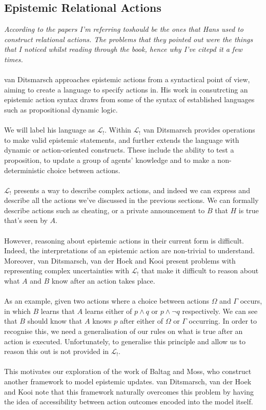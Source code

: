\documentclass[12pt, a4paper, twoside]{article}
\begin{document}
\subsection{Epistemic Relational Actions} \label{epi_acts}
{\em According to \citep{hoek2008dynamic} the papers I'm referring toshould be
	the ones that Hans used to construct relational actions.
The problems that they pointed out were the things that I noticed whilst reading
through the book, hence why I've citepd it a few times.}\\
\\
van Ditsmarsch approaches epistemic actions from a syntactical point of view,
aiming to create a language to specify actions in.
His work in consutrcting an epistemic action syntax draws from some of the
syntax of established languages such as propositional dynamic
logic.\citep{ditmarsch99knowledge,ditmarsch2002dga}\\
\\
We will label his language as $\mathcal{L}_{!}$.
Within $\mathcal{L}_{!}$ van Ditsmarsch provides operations to make valid
epistemic statements, and further extends the language with dynamic or
action-oriented constructs.
These include the ability to test a proposition, to update a group of agents'
knowledge and to make a non-deterministic choice between actions.\\
\\
$\mathcal{L}_{!}$ presents a way to describe complex actions, and indeed we can
express and describe all the actions we've discussed in the previous sections.
We can formally describe actions such as cheating, or a private
announcement to $B$ that $H$ is true that's seen by $A$.\\
\\
However, reasoning about epistemic actions in their current form is difficult.
Indeed, the interpretations of an epistemic action are non-trivial to
understand.
Moreover, van Ditsmarsch, van der Hoek and Kooi present problems with
representing complex uncertainties with $\mathcal{L}_{!}$ that make it difficult
to reason about what $A$ and $B$ know after an action takes place.\\
\\
As an example, given two actions where a choice between actions $\Omega$ and
$\Gamma$ occurs, in which $B$ learns that $A$ learns either of $p \land q$ or
$p \land \neg q$ respectively.
We can see that $B$ should know that $A$ knows $p$ after either of $\Omega$ or
$\Gamma$ occurring.
In order to recognise this, we need a generalisation of our rules on what is
true after an action is executed.
Unfortunately, to generalise this principle and allow us to reason this out is
not provided in $\mathcal{L}_{!}$.\citep{hoek2008dynamic}\\
\\
This motivates our exploration of the work of Baltag and Moss, who construct
another framework to model epistemic updates.
van Ditsmarsch, van der Hoek and Kooi note that this framework naturally
overcomes this problem by having the idea of accessibility between action
outcomes encoded into the model itself.
\end{document}
